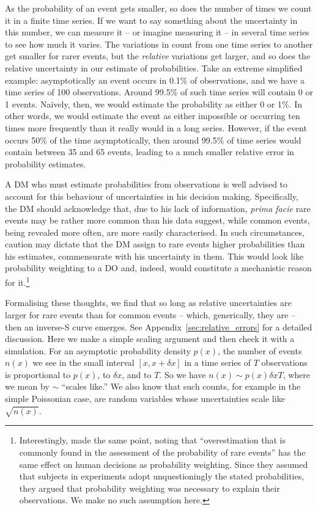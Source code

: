 \documentclass[a4paper, 12pt]{article}
\newcommand{\Appref}[1]{Appendix~\ref{sec:#1}}
\begin{document}
As the probability of an event gets smaller, so does the number of times we count it in a finite time series. If we want to say something about the uncertainty in this number, we can measure it -- or imagine measuring it -- in several time series to see how much it varies. The variations in count from one time series to another get smaller for rarer events, but the \textit{relative} variations get larger, and so does the relative uncertainty in our estimate of probabilities. Take an extreme simplified example: asymptotically an event occurs in 0.1\% of observations, and we have a time series of 100 observations.
Around 99.5\% of such time series will contain 0 or 1 events. Na\"{i}vely, then, we would estimate the probability as either 0 or 1\%. In other words, we would estimate the event as either impossible or occurring ten times more frequently than it really would in a long series. However, if the event occurs 50\% of the time asymptotically, then around 99.5\% of time series would contain between 35 and 65 events, leading to a much smaller relative error in probability estimates.

A DM who must estimate probabilities from observations is well advised to account for this behaviour of uncertainties in his decision making. Specifically, the DM should acknowledge that, due to his lack of information, \textit{prima facie} rare events may be rather more common than his data suggest, while common events, being revealed more often, are more easily characterised. In such circumstances, caution may dictate that the DM assign to rare events higher probabilities than his estimates, commensurate with his uncertainty in them. This would look like probability weighting to a DO and, indeed, would constitute a mechanistic reason for it.\footnote{Interestingly, \textcite[281]{KahnemanTversky1979} made the same point, noting that ``overestimation that is commonly found in the assessment of the probability of rare events'' has the same effect on human decisions as probability weighting. Since they assumed that subjects in experiments adopt unquestioningly the stated probabilities, they argued that probability weighting was necessary to explain their observations. We make no such assumption here.}

Formalising these thoughts, we find that so long as relative uncertainties are larger for rare events than for common events -- which, generically, they are -- then an inverse-S curve emerges. See \Appref{relative_errors} for a detailed discussion. Here we make a simple scaling argument and then check it with a simulation. For an asymptotic probability density $p(x)$, the number of events $n(x)$ we see in the small interval $[x, x+ \delta x]$ in a time series of $T$ observations is proportional to $p(x)$, to $\delta x$, and to $T$. So we have $n(x) \sim p(x) \delta x T$, where we mean by $\sim$ ``scales like.'' We also know that such counts, for example in the simple Poissonian case, are random variables whose uncertainties scale like $\sqrt{n(x)}$.
\end{document}
